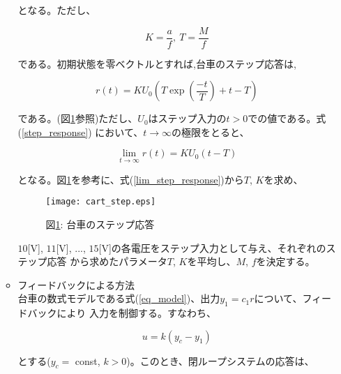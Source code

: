 \documentclass[a4j,11pt,twoside]{jbook}
\begin{document}
\begin{enumerate}
\begin{itemize}
        となる。ただし、

        \begin{equation}
            K = \frac{a}{f},\ T = \frac{M}{f}
        \end{equation}

        である。初期状態を零ベクトルとすれば,台車のステップ応答は,

        \begin{equation}
            r(t) = KU_{0}
            \left(
                T\exp \left(\frac{-t}{T} \right) + t - T
            \right)
            \label{step_response}
        \end{equation}

        である。(図\ref{cart_step}参照)ただし、$U_{0}$はステップ入力の$t > 0$での値である。式(\ref{step_response})
        において、$t \to \infty$の極限をとると、

        \begin{equation}
            \lim_{t \to \infty} r(t) = KU_{0}(t - T)
            \label{lim_step_response}
        \end{equation}

        となる。図\ref{cart_step}を参考に、式(\ref{lim_step_response})から$T$, $K$を求め、

        \begin{figure}[htbp]
            \begin{center}
                \texttt{[image: cart\_step.eps]}
                \caption{図\ref{cart_step}: 台車のステップ応答}
                \label{cart_step}
            \end{center}
        \end{figure}

        $10$[V], $11$[V], ..., $15$[V]の各電圧をステップ入力として与え、それぞれのステップ応答
        から求めたパラメータ$T$, $K$を平均し、$M$, $f$を決定する。

        \newpage
        \item フィードバックによる方法 \\
        \quad 台車の数式モデルである式(\ref{eq_model})、出力$y_{1} = c_{1}r$について、フィードバックにより
        入力を制御する。すなわち、

        \begin{equation}
            u = k(y_{c} - y_{1})
        \end{equation}

        とする($y_{c} =$ const, $k > 0$)。このとき、閉ループシステムの応答は、


\end{itemize}
\end{enumerate}
\end{document}
